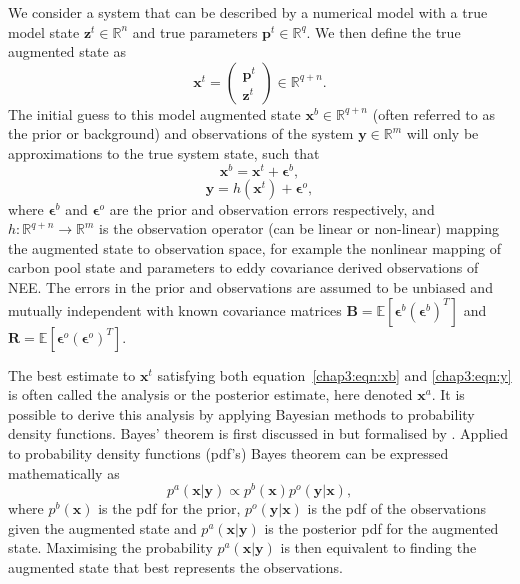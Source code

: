 We consider a system that can be described by a numerical model with a true model state \(\textbf{z}^{t} \in \mathbb{R}^{n}\) and true parameters \(\textbf{p}^{t} \in \mathbb{R}^{q}\). We then define the true augmented state as
\begin{equation}
\textbf{x}^{t} =
\begin{pmatrix}
\textbf{p}^{t} \\
\textbf{z}^{t}
\end{pmatrix}
\in \mathbb{R}^{q+n}.
\end{equation}
The initial guess to this model augmented state \(\textbf{x}^{b} \in \mathbb{R}^{q+n}\) (often referred to as the prior or background) and observations of the system \(\textbf{y} \in \mathbb{R}^{m}\) will only be approximations to the true system state, such that
\begin{equation}
\textbf{x}^{b} = \textbf{x}^{t} + \bm{\epsilon}^{b}, \label{chap3:eqn:xb}
\end{equation} 
\begin{equation}
\textbf{y} = h(\textbf{x}^{t}) + \bm{\epsilon}^{o}, \label{chap3:eqn:y}
\end{equation} 
where \( \bm{\epsilon}^{b}\) and \( \bm{\epsilon}^{o}\) are the prior and observation errors respectively, and \(h: \mathbb{R}^{q+n}\rightarrow \mathbb{R}^{m}\) is the observation operator (can be linear or non-linear) mapping the augmented state to observation space, for example the nonlinear mapping of carbon pool state and parameters to eddy covariance derived observations of NEE. The errors in the prior and observations are assumed to be unbiased and mutually independent with known covariance matrices \(\textbf{B} = \mathbb{E}[\bm{\epsilon}^{b}(\bm{\epsilon}^{b})^{T}]\) and \(\textbf{R} = \mathbb{E}[\bm{\epsilon}^{o}(\bm{\epsilon}^{o})^{T}]\).

The best estimate to \(\textbf{x}^{t}\) satisfying both equation~\eqref{chap3:eqn:xb} and \eqref{chap3:eqn:y} is often called the analysis or the posterior estimate, here denoted \(\textbf{x}^{a}\). It is possible to derive this analysis by applying Bayesian methods to probability density functions. Bayes' theorem is first discussed in \citet{bayes1763} but formalised by \citet{laplace1781memoire}. Applied to probability density functions (pdf's) Bayes theorem can be expressed mathematically as
\begin{equation}
p^a(\textbf{x}|\textbf{y}) \propto p^b(\textbf{x})p^o(\textbf{y}|\textbf{x}), \label{chap3:eqn:bayes}
\end{equation}
where \(p^b(\textbf{x})\) is the pdf for the prior, \(p^o(\textbf{y}|\textbf{x})\) is the pdf of the observations given the augmented state and \(p^a(\textbf{x}|\textbf{y})\) is the posterior pdf for the augmented state. Maximising the probability \(p^a(\textbf{x}|\textbf{y})\) is then equivalent to finding the augmented state that best represents the observations. 

